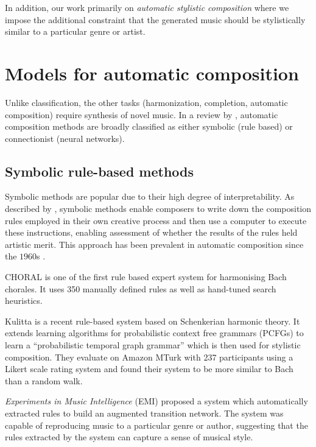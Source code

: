 In addition, our work primarily on \emph{automatic stylistic composition} where
we impose the additional constraint that the generated music should be
stylistically similar to a particular genre or artist.


\section{Models for automatic composition}

Unlike classification, the other tasks (harmonization, completion, automatic
composition) require synthesis of novel music. In a review by
\citet{toiviainen2000symbolic}, automatic composition methods are broadly
classified as either symbolic (\ie rule based) or connectionist (\ie neural
networks).

\subsection{Symbolic rule-based methods}

Symbolic methods are popular due to their high degree of interpretability. As
described by \citet{todd1989connectionist}, symbolic methods enable composers
to write down the composition rules employed in their own creative process
and then use a computer to execute these instructions, enabling assessment of
whether the results of the rules held artistic merit. This approach has been
prevalent in automatic composition since the $1960$s
\citep{todd1989connectionist}.

CHORAL \citep{ebciouglu1988expert} is one of the first rule based expert system
for harmonising Bach chorales. It uses 350 manually defined rules as well as
hand-tuned search heuristics.

Kulitta \citep{quick2014kulitta} is a recent rule-based system based on
Schenkerian harmonic theory\cite{schenker1954harmony}. It extends learning
algorithms for probabilistic context free grammars (PCFGs) to learn a
``probabilistic temporal graph grammar'' \citep{quick2013temporal} which is
then used for stylistic composition. They evaluate on Amazon MTurk with 237
participants using a Likert scale rating system \citep{likert1932technique}
and found their system to be more similar to Bach than a random walk.

\emph{Experiments in Music Intelligence} (EMI)
\citep{cope1987experiments,cope1992computer} proposed a system which
automatically extracted rules to build an augmented transition
network\citep{wanner1980atn}. The system was capable of reproducing music
to a particular genre or author, suggesting that the rules extracted by the
system can capture a sense of musical style.

